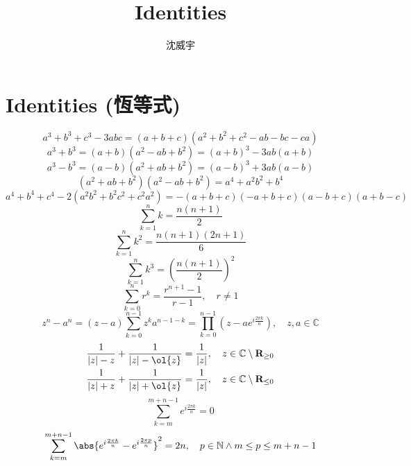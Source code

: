 \documentclass[a4paper,12pt]{article}
\begin{document}
\title{Identities}
\author{沈威宇}
\date{\temtoday}
\titletocdoc
\section{Identities (恆等式)}
\[a^3+b^3+c^3-3abc=(a+b+c)(a^2+b^2+c^2-ab-bc-ca)\]
\[a^3+b^3=(a+b)(a^2-ab+b^2)=(a+b)^3-3ab(a+b)\]
\[a^3-b^3=(a-b)(a^2+ab+b^2)=(a-b)^3+3ab(a-b)\]
\[(a^2+ab+b^2)(a^2-ab+b^2)=a^4+a^2b^2+b^4\]
\[a^4+b^4+c^4-2(a^2b^2+b^2c^2+c^2a^2)=-(a+b+c)(-a+b+c)(a-b+c)(a+b-c)\]
\[\sum_{k=1}^nk=\frac{n(n+1)}{2}\]
\[\sum_{k=1}^nk^2=\frac{n(n+1)(2n+1)}{6}\]
\[\sum_{k=1}^nk^3=\left(\frac{n(n+1)}{2}\right)^2\]
\[\sum_{k=0}^{n}r^k=\frac{r^{n+1}-1}{r-1},\quad r\neq1\]
\[z^n-a^n=(z-a)\sum_{k=0}^{n-1}z^ka^{n-1-k}=\prod_{k=0}^{n-1}\left(z-ae^{i\frac{2\pi k}{n}}\right),\quad z,a\in\mathbb{C}\]
\[\begin{aligned}
&\frac{1}{|z|-z}+\frac{1}{|z|-\ol{z}}=\frac{1}{|z|},\quad z\in\mathbb{C}\setminus\mathbf{R}_{\geq 0}\\
&\frac{1}{|z|+z}+\frac{1}{|z|+\ol{z}}=\frac{1}{|z|},\quad z\in\mathbb{C}\setminus\mathbf{R}_{\leq 0}
\end{aligned}\]
\[\sum_{k=m}^{m+n-1}e^{i\frac{2\pi k}{n}}=0\]
\[\sum_{k=m}^{m+n-1}\abs{e^{i\frac{2\pi k}{n}}-e^{i\frac{2\pi p}{n}}}^2=2n,\quad p\in\mathbb{N}\land m\leq p\leq m+n-1\]
\end{document}
